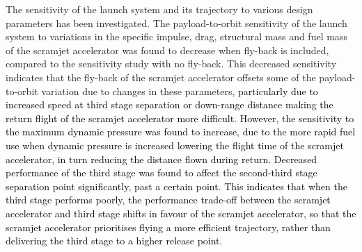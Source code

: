 The sensitivity of the launch system and its trajectory to various design parameters has been investigated. 
The payload-to-orbit sensitivity of the launch system to variations in the specific impulse, drag, structural mass and fuel mass of the scramjet accelerator was found to decrease when fly-back is included, compared to the sensitivity study with no fly-back. This decreased sensitivity indicates that the fly-back of the scramjet accelerator offsets some of the payload-to-orbit variation due to changes in these parameters, \textcolor{black}{particularly due to increased speed at third stage separation or down-range distance making the return flight of the scramjet accelerator more difficult}. \textcolor{black}{However, the sensitivity to the maximum dynamic pressure was found to increase, due to the more rapid fuel use when dynamic pressure is increased lowering the flight time of the scramjet accelerator, in turn reducing the distance flown during return. Decreased performance of the third stage was found to affect the second-third stage separation point significantly, past a certain point. This indicates that when the third stage performs poorly, the performance trade-off between the scramjet accelerator and third stage shifts in favour of the scramjet accelerator, so that the scramjet accelerator prioritises flying a more efficient trajectory, rather than delivering the third stage to a higher release point.}


